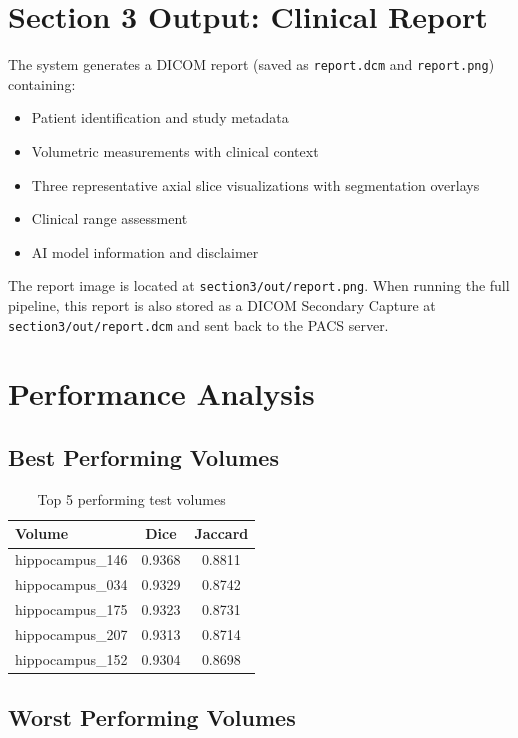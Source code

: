 \documentclass[12pt,a4paper]{report}
\begin{document}
\section{Section 3 Output: Clinical Report}

The system generates a DICOM report (saved as \texttt{report.dcm} and \texttt{report.png}) containing:

\begin{itemize}
    \item Patient identification and study metadata
    \item Volumetric measurements with clinical context
    \item Three representative axial slice visualizations with segmentation overlays
    \item Clinical range assessment
    \item AI model information and disclaimer
\end{itemize}

The report image is located at \texttt{section3/out/report.png}. When running the full pipeline, this report is also stored as a DICOM Secondary Capture at \texttt{section3/out/report.dcm} and sent back to the PACS server.

\section{Performance Analysis}

\subsection{Best Performing Volumes}

\begin{table}[H]
\centering
\begin{tabular}{lcc}
\toprule
\textbf{Volume} & \textbf{Dice} & \textbf{Jaccard} \\
\midrule
hippocampus\_146 & 0.9368 & 0.8811 \\
hippocampus\_034 & 0.9329 & 0.8742 \\
hippocampus\_175 & 0.9323 & 0.8731 \\
hippocampus\_207 & 0.9313 & 0.8714 \\
hippocampus\_152 & 0.9304 & 0.8698 \\
\bottomrule
\end{tabular}
\caption{Top 5 performing test volumes}
\end{table}

\subsection{Worst Performing Volumes}
\end{document}
